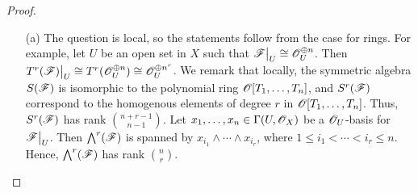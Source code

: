 \documentclass{article}
\begin{document}
\begin{enumerate} [label=\textbf{\arabic*.}, leftmargin=0em]
\begin{proof} $ $ \vspace{0pt}
\begin{itemize} [leftmargin=0cm]
\item[(a)] The question is local, so the statements follow from the case for rings. For example, let $U$ be an open set in $X$ such that $\restr{\fF}{U} \cong \fO_U^{\oplus n}$. Then $\restr{T^r(\fF)}{U} \cong T^r(\fO_U^{\oplus n}) \cong \fO_U^{\oplus n^r}$. We remark that locally, the symmetric algebra $S(\mathscr{F})$ is isomorphic to the polynomial ring $\mathscr{O}[T_1, \dots, T_n]$, and $S^r(\mathscr{F})$ correspond to the homogenous elements of degree $r$ in $\mathscr{O}[T_1, \dots, T_n]$. Thus, $S^r(\mathscr{F})$ has rank ${n + r - 1 \choose n - 1}$. Let $x_1, \dots, x_n \in \Gamma(U, \mathscr{O}_X)$ be a $\mathscr{O}_U$-basis for $\restr{\fF}{U}$. Then $\bigwedge^r(\mathscr{F})$ is spanned by $x_{i_1} \wedge \cdots \wedge x_{i_r}$, where $1 \leq i_1 < \cdots < i_r \leq n$. Hence, $\bigwedge^r(\mathscr{F})$ has rank ${n \choose r}$.
\end{itemize}
\end{proof}

\end{enumerate}
\end{document}
